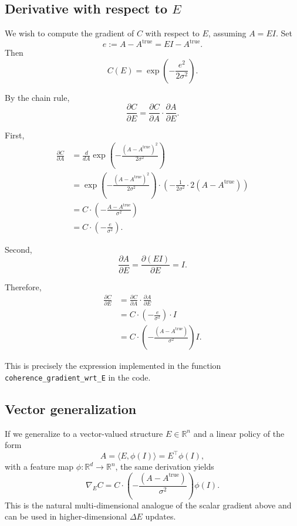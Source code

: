 \documentclass[12pt,a4paper]{report}
\begin{document}
\subsection*{Derivative with respect to \texorpdfstring{$E$}{E}}

We wish to compute the gradient of \(C\) with respect to \(E\), assuming \(A = E I\). Set
\[
    e := A - A^{\mathrm{true}} = E I - A^{\mathrm{true}}.
\]
Then
\[
    C(E) = \exp\!\left( -\frac{e^2}{2\sigma^2} \right).
\]

By the chain rule,
\[
    \frac{\partial C}{\partial E}
    = \frac{\partial C}{\partial A} \cdot \frac{\partial A}{\partial E}.
\]

First,
\begin{align}
    \frac{\partial C}{\partial A}
    &= \frac{d}{dA} \exp\!\left( -\frac{(A - A^{\mathrm{true}})^2}{2\sigma^2} \right) \\
    &= \exp\!\left( -\frac{(A - A^{\mathrm{true}})^2}{2\sigma^2} \right)
       \cdot \left( -\frac{1}{2\sigma^2} \cdot 2 (A - A^{\mathrm{true}}) \right) \\
    &= C \cdot \left( -\frac{A - A^{\mathrm{true}}}{\sigma^2} \right) \\
    &= C \cdot \left( -\frac{e}{\sigma^2} \right).
\end{align}

Second,
\begin{equation}
    \frac{\partial A}{\partial E} = \frac{\partial (E I)}{\partial E} = I.
\end{equation}

Therefore,
\begin{align}
    \frac{\partial C}{\partial E}
    &= \frac{\partial C}{\partial A} \cdot \frac{\partial A}{\partial E} \\
    &= C \cdot \left( -\frac{e}{\sigma^2} \right) \cdot I \\
    &= C \cdot \left( -\frac{(A - A^{\mathrm{true}})}{\sigma^2} \right) I.
\end{align}

This is precisely the expression implemented in the function \texttt{coherence\_gradient\_wrt\_E} in the code.

\subsection*{Vector generalization}

If we generalize to a vector-valued structure \(E \in \mathbb{R}^n\) and a linear policy of the form
\[
    A = \langle E, \phi(I) \rangle = E^\top \phi(I),
\]
with a feature map \(\phi : \mathbb{R}^d \to \mathbb{R}^n\), the same derivation yields
\begin{equation}
    \nabla_E C
    = C \cdot \left( -\frac{(A - A^{\mathrm{true}})}{\sigma^2} \right) \phi(I).
\end{equation}
This is the natural multi-dimensional analogue of the scalar gradient above and can be used in higher-dimensional $\Delta E$ updates.
\end{document}
